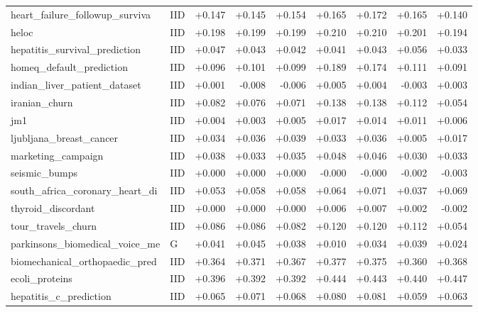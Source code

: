 \begin{longtable}{@{}p{3.95cm}lrrrrrrr@{}}
heart\_\allowbreak{}failure\_\allowbreak{}followup\_\allowbreak{}surviva & IID & +0.147 & +0.145 & +0.154 & +0.165 & +0.172 & +0.165 & +0.140\\
heloc & IID & +0.198 & +0.199 & +0.199 & +0.210 & +0.210 & +0.201 & +0.194\\
hepatitis\_\allowbreak{}survival\_\allowbreak{}prediction & IID & +0.047 & +0.043 & +0.042 & +0.041 & +0.043 & +0.056 & +0.033\\
homeq\_\allowbreak{}default\_\allowbreak{}prediction & IID & +0.096 & +0.101 & +0.099 & +0.189 & +0.174 & +0.111 & +0.091\\
indian\_\allowbreak{}liver\_\allowbreak{}patient\_\allowbreak{}dataset & IID & +0.001 & -0.008 & -0.006 & +0.005 & +0.004 & -0.003 & +0.003\\
iranian\_\allowbreak{}churn & IID & +0.082 & +0.076 & +0.071 & +0.138 & +0.138 & +0.112 & +0.054\\
jm1 & IID & +0.004 & +0.003 & +0.005 & +0.017 & +0.014 & +0.011 & +0.006\\
ljubljana\_\allowbreak{}breast\_\allowbreak{}cancer & IID & +0.034 & +0.036 & +0.039 & +0.033 & +0.036 & +0.005 & +0.017\\
marketing\_\allowbreak{}campaign & IID & +0.038 & +0.033 & +0.035 & +0.048 & +0.046 & +0.030 & +0.033\\
seismic\_\allowbreak{}bumps & IID & +0.000 & +0.000 & +0.000 & -0.000 & -0.000 & -0.002 & -0.003\\
south\_\allowbreak{}africa\_\allowbreak{}coronary\_\allowbreak{}heart\_\allowbreak{}di & IID & +0.053 & +0.058 & +0.058 & +0.064 & +0.071 & +0.037 & +0.069\\
thyroid\_\allowbreak{}discordant & IID & +0.000 & +0.000 & +0.000 & +0.006 & +0.007 & +0.002 & -0.002\\
tour\_\allowbreak{}travels\_\allowbreak{}churn & IID & +0.086 & +0.086 & +0.082 & +0.120 & +0.120 & +0.112 & +0.054\\
parkinsons\_\allowbreak{}biomedical\_\allowbreak{}voice\_\allowbreak{}me & G & +0.041 & +0.045 & +0.038 & +0.010 & +0.034 & +0.039 & +0.024\\
\midrule
biomechanical\_\allowbreak{}orthopaedic\_\allowbreak{}pred & IID & +0.364 & +0.371 & +0.367 & +0.377 & +0.375 & +0.360 & +0.368\\
ecoli\_\allowbreak{}proteins & IID & +0.396 & +0.392 & +0.392 & +0.444 & +0.443 & +0.440 & +0.447\\
hepatitis\_\allowbreak{}c\_\allowbreak{}prediction & IID & +0.065 & +0.071 & +0.068 & +0.080 & +0.081 & +0.059 & +0.063\\

\end{longtable}
